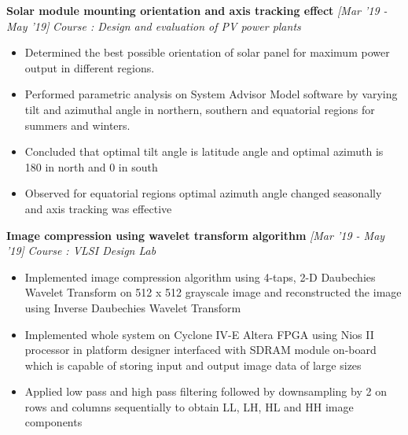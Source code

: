 \documentclass[10 pt]{article}%
\begin{document}
{\flushleft \textbf {\large{Solar module mounting orientation and axis tracking effect}} \hfill {{{\em{[Mar '19 - May '19]}}}}
\vspace{-0.8em}
{\flushleft \em{Course : Design and evaluation of PV power plants}}
\vspace{-5pt}
\begin{itemize}[leftmargin=*]
	\setlength\itemsep{1.5pt}
	\setlength\parskip{1.5pt}
  \item Determined the best possible orientation of solar panel for maximum power output in different regions.
\item Performed parametric analysis on System Advisor Model software by varying tilt and azimuthal angle in northern, southern and equatorial regions for summers and winters.
\item Concluded that optimal tilt angle is latitude angle and optimal azimuth is 180 in north and 0 in south
\item Observed for equatorial regions optimal azimuth angle changed seasonally and axis tracking was effective
\end{itemize}
{\flushleft \textbf {\large{Image compression using wavelet transform algorithm}} \hfill {{{\em{[Mar '19 - May '19]}}}}
	\vspace{-0.8em}
	{\flushleft \em{Course : VLSI Design Lab}}
	\vspace{-5pt}
	\begin{itemize}[leftmargin=*]
		\setlength\itemsep{1.5pt}
		\setlength\parskip{1.5pt}
\item Implemented image compression algorithm using 4-taps, 2-D Daubechies Wavelet Transform on 512 x 512 grayscale image and reconstructed the image using Inverse Daubechies Wavelet Transform
\item Implemented whole system on Cyclone IV-E Altera FPGA using Nios II processor in platform designer interfaced with SDRAM module on-board which is capable of storing input and output image data of large sizes
\item Applied low pass and high pass filtering followed by downsampling by 2 on rows and columns sequentially to obtain LL, LH, HL and HH image components

\end{itemize}}}
\end{document}

